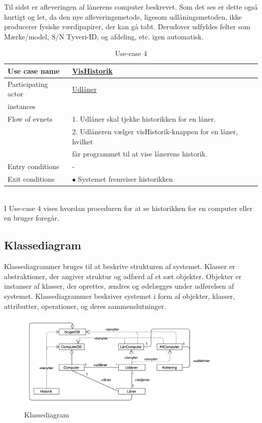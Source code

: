 \documentclass[a4paper]{article}
\begin{document}
Til sidst er afleveringen af lånerens computer beskrevet. Som det ses er dette også hurtigt og let, da den nye afleveringsmetode, ligesom udlåningsmetoden, ikke producerer fysiske værdipapirer, der kan gå tabt. Derudover udfyldes felter som Mærke/model, S/N Tyveri-ID, og afdeling, etc. igen automatisk. \\
\begin{table}[h]
\caption{Use-case 4}
\begin{tabular}{ll}
Use case name               & \underline{VisHistorik} \\ \hline
Participating actor           & \underline{Udlåner} \\
instances\\ \hline
Flow of evnets                & 1. Udlåner skal tjekke historikken for en låner.
                            \\& 2. Udlåneren vælger visHistorik-knappen for en låner, hvilket
                            \\& får programmet til at vise lånerens historik.  \\ \hline
Entry conditions & - \\ \hline
Exit conditions  & $\bullet$ Systemet fremviser historikken
\end{tabular}
\end{table}\\
I Use-case 4 vises hvordan proceduren for at se historikken for en computer eller en bruger foregår.
\newpage
\subsection{Klassediagram}
Klassediagrammer bruges til at beskrive strukturen af systemet. Klasser er abstraktioner, der angiver struktur og adfærd af et sæt objekter. Objekter er instanser af klasser, der oprettes, ændres og ødelægges under udførelsen af systemet. Klassediagrammer beskriver systemet i form af objekter, klasser, attributter, operationer, og deres sammenslutninger. \cite[p~30]{OOSE}
\begin{figure}[h!]
\includegraphics[width=0.9\textwidth]{Klassediagram}
  \caption{Klassediagram}
    \label{fig:KLS}
  \centering
\end{figure}
\end{document}
